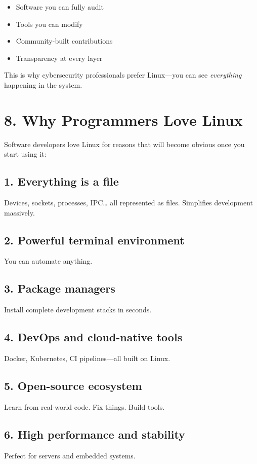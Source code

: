 \documentclass[12pt]{article}
\begin{document}
\begin{itemize}
    \item Software you can fully audit
    \item Tools you can modify
    \item Community-built contributions
    \item Transparency at every layer
\end{itemize}

This is why cybersecurity professionals prefer Linux—you can see \textit{everything} happening in the system.

\section*{8. Why Programmers Love Linux}

Software developers love Linux for reasons that will become obvious once you start using it:

\subsection*{1. Everything is a file}
Devices, sockets, processes, IPC… all represented as files. Simplifies development massively.

\subsection*{2. Powerful terminal environment}
You can automate anything.

\subsection*{3. Package managers}
Install complete development stacks in seconds.

\subsection*{4. DevOps and cloud-native tools}
Docker, Kubernetes, CI pipelines—all built on Linux.

\subsection*{5. Open-source ecosystem}
Learn from real-world code. Fix things. Build tools.

\subsection*{6. High performance and stability}
Perfect for servers and embedded systems.
\end{document}
